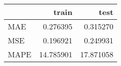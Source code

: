 \begin{tabular}{lrr}
\toprule
{} &      train &       test \\
\midrule
MAE  &   0.276395 &   0.315270 \\
MSE  &   0.196921 &   0.249931 \\
MAPE &  14.785901 &  17.871058 \\
\bottomrule
\end{tabular}
